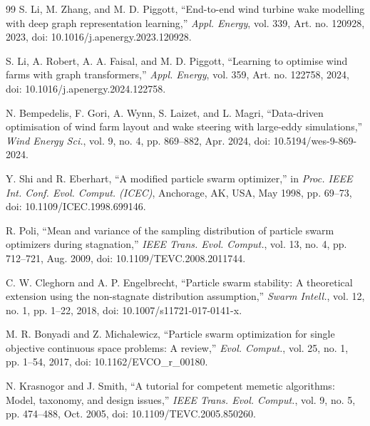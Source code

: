 {\begin{thebibliography}{99}
S. Li, M. Zhang, and M. D. Piggott, ``End-to-end wind turbine wake modelling with deep graph representation learning,'' \textit{Appl. Energy}, vol. 339, Art. no. 120928, 2023, doi: 10.1016/j.apenergy.2023.120928.

S. Li, A. Robert, A. A. Faisal, and M. D. Piggott, ``Learning to optimise wind farms with graph transformers,'' \textit{Appl. Energy}, vol. 359, Art. no. 122758, 2024, doi: 10.1016/j.apenergy.2024.122758.

N. Bempedelis, F. Gori, A. Wynn, S. Laizet, and L. Magri, ``Data-driven optimisation of wind farm layout and wake steering with large-eddy simulations,'' \textit{Wind Energy Sci.}, vol. 9, no. 4, pp. 869--882, Apr. 2024, doi: 10.5194/wes-9-869-2024.

Y. Shi and R. Eberhart, ``A modified particle swarm optimizer,'' in \textit{Proc. IEEE Int. Conf. Evol. Comput. (ICEC)}, Anchorage, AK, USA, May 1998, pp. 69--73, doi: 10.1109/ICEC.1998.699146.

R. Poli, ``Mean and variance of the sampling distribution of particle swarm optimizers during stagnation,'' \textit{IEEE Trans. Evol. Comput.}, vol. 13, no. 4, pp. 712--721, Aug. 2009, doi: 10.1109/TEVC.2008.2011744.

C. W. Cleghorn and A. P. Engelbrecht, ``Particle swarm stability: A theoretical extension using the non-stagnate distribution assumption,'' \textit{Swarm Intell.}, vol. 12, no. 1, pp. 1--22, 2018, doi: 10.1007/s11721-017-0141-x.

M. R. Bonyadi and Z. Michalewicz, ``Particle swarm optimization for single objective continuous space problems: A review,'' \textit{Evol. Comput.}, vol. 25, no. 1, pp. 1--54, 2017, doi: 10.1162/EVCO\_r\_00180.

N. Krasnogor and J. Smith, ``A tutorial for competent memetic algorithms: Model, taxonomy, and design issues,'' \textit{IEEE Trans. Evol. Comput.}, vol. 9, no. 5, pp. 474--488, Oct. 2005, doi: 10.1109/TEVC.2005.850260.


\end{thebibliography}}
